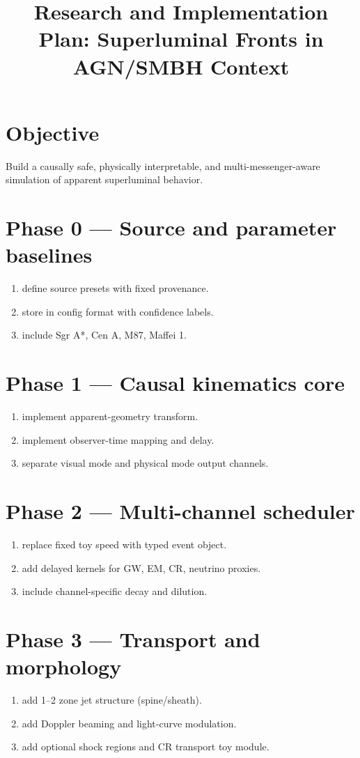 \documentclass[11pt]{article}
\begin{document}
\title{Research and Implementation Plan: Superluminal Fronts in AGN/SMBH Context}
\date{}
\maketitle

\section{Objective}
Build a causally safe, physically interpretable, and multi-messenger-aware simulation of apparent superluminal behavior.

\section{Phase 0 --- Source and parameter baselines}
\begin{enumerate}
\item define source presets with fixed provenance.
\item store in config format with confidence labels.
\item include Sgr A*, Cen A, M87, Maffei 1.
\end{enumerate}

\section{Phase 1 --- Causal kinematics core}
\begin{enumerate}
\item implement apparent-geometry transform.
\item implement observer-time mapping and delay.
\item separate visual mode and physical mode output channels.
\end{enumerate}

\section{Phase 2 --- Multi-channel scheduler}
\begin{enumerate}
\item replace fixed toy speed with typed event object.
\item add delayed kernels for GW, EM, CR, neutrino proxies.
\item include channel-specific decay and dilution.
\end{enumerate}

\section{Phase 3 --- Transport and morphology}
\begin{enumerate}
\item add 1--2 zone jet structure (spine/sheath).
\item add Doppler beaming and light-curve modulation.
\item add optional shock regions and CR transport toy module.
\end{enumerate}
\end{document}
